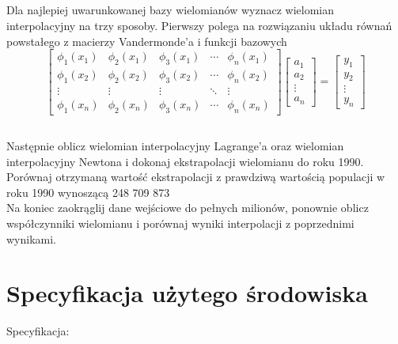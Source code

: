 \documentclass[11pt]{scrartcl}
\begin{document}
    \subsection*{}
    Dla najlepiej uwarunkowanej bazy wielomianów wyznacz wielomian
    interpolacyjny na trzy sposoby. Pierwszy polega na rozwiązaniu
    układu równań powstałego z macierzy Vandermonde'a i funkcji bazowych
    \[
        \begin{bmatrix}
            \phi_1(x_1) & \phi_2(x_1) & \phi_3(x_1) & \cdots &
            \phi_n(x_1) \\
            \phi_1(x_2) & \phi_2(x_2) & \phi_3(x_2) & \cdots &
            \phi_n(x_2) \\
            \vdots & \vdots & \vdots & \ddots & \vdots \\
            \phi_1(x_n) & \phi_2(x_n) & \phi_3(x_n) & \cdots &
            \phi_n(x_n)
        \end{bmatrix}
        \begin{bmatrix}
            a_1 \\
            a_2 \\
            \vdots \\
            a_n
        \end{bmatrix}
        =
        \begin{bmatrix}
            y_1 \\
            y_2 \\
            \vdots \\
            y_n
        \end{bmatrix}
    \]

    \subsection*{}
    Następnie oblicz wielomian interpolacyjny Lagrange'a oraz wielomian
    interpolacyjny Newtona i dokonaj ekstrapolacji wielomianu do
    roku 1990. Porównaj otrzymaną wartość ekstrapolacji z prawdziwą
    wartością populacji w roku 1990 wynoszącą 248 709 873 \\
    Na koniec zaokrąglij dane wejściowe do pełnych milionów, ponownie
    oblicz współczynniki wielomianu i porównaj wyniki interpolacji
    z poprzednimi wynikami.

    \section{Specyfikacja użytego środowiska}
    Specyfikacja:
\end{document}
